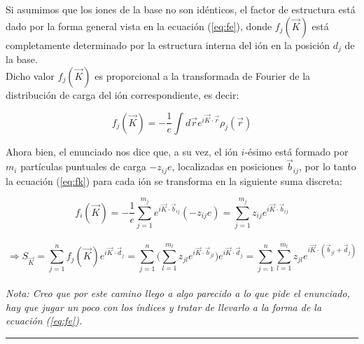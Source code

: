 \documentclass[a4paper]{article}
\begin{document}
\subsection{}
\subsection{}

Si asumimos que los iones de la base no son id\'enticos, el factor de estructura est\'a dado por la forma general vista en la ecuaci\'on (\ref{eq:fe}), donde $f_{j}(\vec{K})$ est\'a completamente determinado por la estructura interna del i\'on en la posici\'on $d_{j}$ de la base.\\

Dicho valor $f_{j}(\vec{K})$ es proporcional a la transformada de Fourier de la distribuci\'on de carga del i\'on correspondiente, es decir:

\begin{equation}
\label{eq:fk}
f_{j}(\vec{K}) = -\frac{1}{e}\int d\vec{r} e^{i\vec{K} \cdot \vec{r}} \rho_{j}(\vec{r}) 
\end{equation}

Ahora bien, el enunciado nos dice que, a su vez, el i\'on $i$-\'esimo est\'a formado por $m_{i}$ part\'iculas puntuales de carga $-z_{ij}e$, localizadas en posiciones $\vec{b}_{ij}$, por lo tanto la ecuaci\'on (\ref{eq:fk}) para cada i\'on se transforma en la siguiente suma discreta:

\begin{equation}
\label{eq:fi}
f_{i}(\vec{K}) = -\frac{1}{e}\sum_{j = 1}^{m_{j}}e^{i\vec{K} \cdot \vec{b}_{ij}}(-z_{ij}e) = \sum_{j = 1}^{m_{j}}z_{ij}e^{i\vec{K} \cdot \vec{b}_{ij}}
\end{equation}
\\

$$\Rightarrow S_{\vec{K}} = \sum_{j = 1}^{n} f_{j}(\vec{K})e^{i\vec{K} \cdot \vec{d}_{j}} = \sum_{j = 1}^{n} \bigg(\sum_{l = 1}^{m_{l}}z_{jl}e^{i\vec{K} \cdot \vec{b}_{jl}}\bigg)e^{i\vec{K} \cdot \vec{d}_{j}} =  \sum_{j = 1}^{n}\sum_{l = 1}^{m_{l}}z_{jl}e^{i\vec{K} \cdot (\vec{b}_{jl} + \vec{d}_{j})}$$ 
\\
\textit{Nota: Creo que por este camino llego a algo parecido a lo que pide el enunciado, hay que jugar un poco con los \'indices y tratar de llevarlo a la forma de la ecuaci\'on (\ref{eq:fe}).}


\begin{center}
\noindent\rule{15cm}{0.4pt}
\end{center}
\end{document}
